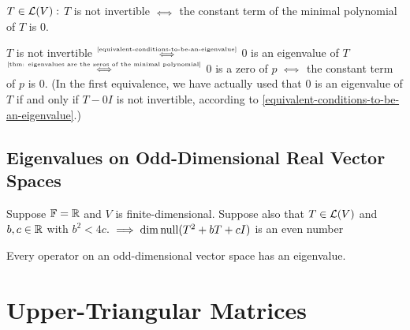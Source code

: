\begin{thm} 
  $T \in \mathcal{L} (V):$ $T$ is not invertible $\mathsmaller{\iff}$ the constant term of the minimal polynomial of $T$ is $0$.
\end{thm}
\begin{prf}
  $T$ is not invertible $\mathsmaller{\overset{\text{\ref{equivalent-conditions-to-be-an-eigenvalue}}}{\iff}}$ $0$ is an eigenvalue of $T$ $\mathsmaller{\overset{\text{\ref{thm: eigenvalues are the zeros of the minimal polynomial}}}{\iff}}$ $0$ is a zero of $p$ $\mathsmaller{\iff}$ the constant term of $p$ is $0$.
  (In the first equivalence, we have actually used that $0$ is an eigenvalue of $T$ if and only if $T-0I$ is not invertible, according to \ref{equivalent-conditions-to-be-an-eigenvalue}.)
  
\end{prf}

\subsection{Eigenvalues on Odd-Dimensional Real Vector Spaces}
\begin{thm}
  Suppose $\mathbb{F} = \mathbb{R}$ and $V$ is finite-dimensional. Suppose also that $T \in \mathcal{L} (V)$ and $b,c \in \mathbb{R}$ with $b^2 < 4c$. 
  $\implies \dim \operatorname{null} (T^2 +bT +cI)$ is an even number
\end{thm}

\begin{thm}
  Every operator on an odd-dimensional vector space has an eigenvalue.
\end{thm}

\section{Upper-Triangular Matrices}

